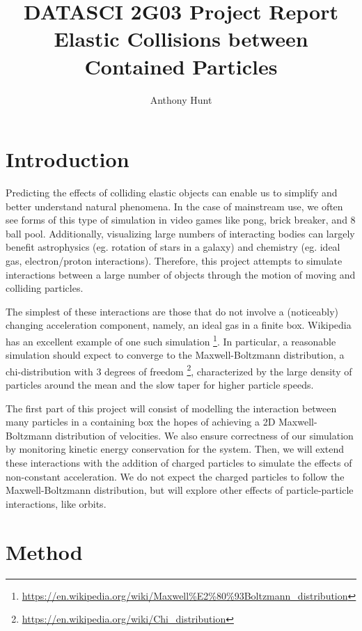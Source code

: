 \documentclass{article}
\title{DATASCI 2G03 Project Report \\\large
Elastic Collisions between Contained Particles}
\author{Anthony Hunt}
\begin{document}
\maketitle

\section{Introduction}
Predicting the effects of colliding elastic objects can enable us to simplify and better understand natural phenomena.
In the case of mainstream use, we often see forms of this type of simulation in video games like pong, brick breaker, and 8 ball pool.
Additionally, visualizing large numbers of interacting bodies can largely benefit
astrophysics (eg. rotation of stars in a galaxy) and chemistry (eg. ideal gas, electron/proton interactions).
Therefore, this project attempts to simulate interactions between a large number of objects through
the motion of moving and colliding particles.

The simplest of these interactions are those that do not involve a (noticeably) changing acceleration component,
namely, an ideal gas in a finite box. Wikipedia has an excellent example of one such simulation
\footnote{\url{https://en.wikipedia.org/wiki/Maxwell\%E2\%80\%93Boltzmann_distribution}}.
In particular, a reasonable simulation should expect to converge to the Maxwell-Boltzmann distribution,
a chi-distribution with 3 degrees of freedom \footnote{\url{https://en.wikipedia.org/wiki/Chi_distribution}},
characterized by the large density of particles around the mean and the slow taper for higher particle speeds.

The first part of this project will consist of modelling the interaction between many particles
in a containing box the hopes of achieving a 2D Maxwell-Boltzmann distribution of velocities.
We also ensure correctness of our simulation by monitoring kinetic energy conservation for the system.
Then, we will extend these interactions with the addition of charged particles to simulate the effects of non-constant acceleration.
We do not expect the charged particles to follow the Maxwell-Boltzmann distribution,
but will explore other effects of particle-particle interactions, like orbits.


\section{Method}
\end{document}
